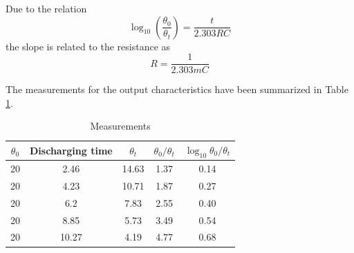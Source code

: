 \documentclass{article}
\begin{document}
	Due to the relation \[\log_{10}\left(\frac{\theta_0}{\theta_t}\right) = \frac{t}{2.303 RC}\] the slope is related to the resistance as \[R = \frac{1}{2.303mC}\]
	
	The measurements for the output characteristics have been summarized in Table \ref{tab:out}.
	
	\begin{table}[!h]
		\centering
		\begin{tabular}{|c|c|c|c|c|}
			\hline
			$\theta_0$ & Discharging time & $\theta_t$ & $\theta_0/\theta_t$ & $\log_{10}\theta_0/\theta_t$ \\
			\hline
			20         & 2.46             & 14.63      & 1.37   & 0.14          \\
			20         & 4.23             & 10.71      & 1.87  & 0.27           \\
			20         & 6.2              & 7.83       & 2.55   & 0.40           \\
			20         & 8.85             & 5.73       & 3.49   & 0.54           \\
			20         & 10.27            & 4.19       & 4.77    & 0.68 \\
			\hline         
		\end{tabular}
	\caption{Measurements}
	\label{tab:out}
	\end{table}
	
\end{document}
